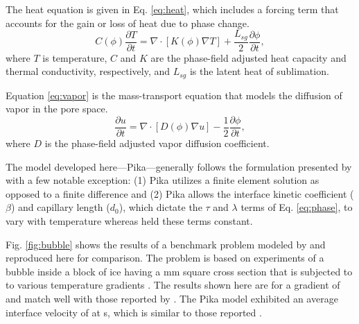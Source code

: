 The heat equation is given in Eq. \eqref{eq:heat}, which includes a forcing term that accounts for the gain or loss of heat due to phase change.
\begin{equation}\label{eq:heat}
C(\phi)\frac{\partial T}{\partial t} = \nabla \cdot [K(\phi) \nabla T] + \frac{L_{sg}}{2}\frac{\partial \phi}{\partial t},
\end{equation}
where $T$ is temperature, $C$ and $K$ are the phase-field adjusted heat capacity and thermal conductivity, respectively, and $L_{sg}$ is the latent heat of sublimation.

Equation \ref{eq:vapor} is the mass-transport equation that models the diffusion of vapor in the pore space.
\begin{equation}\label{eq:vapor}
\frac{\partial u}{\partial t} = \nabla \cdot[ D(\phi) \nabla u] - \frac{1}{2}\frac{\partial \phi}{\partial t},
\end{equation}
where $D$ is the phase-field adjusted vapor diffusion coefficient.

The model developed here---Pika---generally follows the formulation presented by \citet{kaempfer2009phase} with a few notable exception: (1) Pika utilizes a finite element solution as opposed to a finite difference and (2) Pika allows the interface kinetic coefficient ($\beta$) and capillary length ($d_0$), which dictate the $\tau$ and $\lambda$ terms of Eq. \eqref{eq:phase}, to vary with temperature whereas \citet{kaempfer2009phase} held these terms constant.

Fig. \ref{fig:bubble} shows the results of a benchmark problem modeled by \citet{kaempfer2009phase} and reproduced here for comparison. The problem is based on experiments of a bubble inside a block of ice having a \unit[5]{mm} square cross section that is subjected to to various temperature gradients \citep{nakaya1956technical, stehle1965technical}. The results shown here are for a gradient of  and match well with those reported by \citet{kaempfer2009phase}. The Pika model exhibited an average interface velocity of  at \unit[7200]{s}, which is similar to those reported \citet{kaempfer2009phase}.

